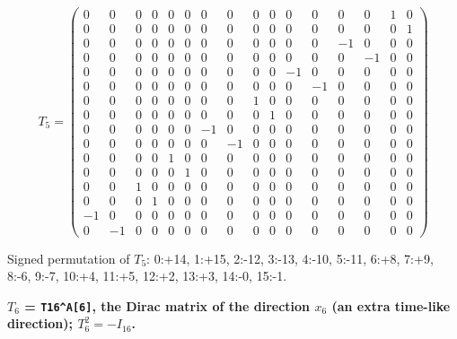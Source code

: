 \documentclass[
  10pt,
]{article}
\begin{document}
\[
T_5 = \scriptstyle \begin{pmatrix} 0 & 0 & 0 & 0 & 0 & 0 & 0 & 0 & 0 & 0 & 0 & 0 & 0 & 0 & 1 & 0 \\ 0 & 0 & 0 & 0 & 0 & 0 & 0 & 0 & 0 & 0 & 0 & 0 & 0 & 0 & 0 & 1 \\ 0 & 0 & 0 & 0 & 0 & 0 & 0 & 0 & 0 & 0 & 0 & 0 & -1 & 0 & 0 & 0 \\ 0 & 0 & 0 & 0 & 0 & 0 & 0 & 0 & 0 & 0 & 0 & 0 & 0 & -1 & 0 & 0 \\ 0 & 0 & 0 & 0 & 0 & 0 & 0 & 0 & 0 & 0 & -1 & 0 & 0 & 0 & 0 & 0 \\ 0 & 0 & 0 & 0 & 0 & 0 & 0 & 0 & 0 & 0 & 0 & -1 & 0 & 0 & 0 & 0 \\ 0 & 0 & 0 & 0 & 0 & 0 & 0 & 0 & 1 & 0 & 0 & 0 & 0 & 0 & 0 & 0 \\ 0 & 0 & 0 & 0 & 0 & 0 & 0 & 0 & 0 & 1 & 0 & 0 & 0 & 0 & 0 & 0 \\ 0 & 0 & 0 & 0 & 0 & 0 & -1 & 0 & 0 & 0 & 0 & 0 & 0 & 0 & 0 & 0 \\ 0 & 0 & 0 & 0 & 0 & 0 & 0 & -1 & 0 & 0 & 0 & 0 & 0 & 0 & 0 & 0 \\ 0 & 0 & 0 & 0 & 1 & 0 & 0 & 0 & 0 & 0 & 0 & 0 & 0 & 0 & 0 & 0 \\ 0 & 0 & 0 & 0 & 0 & 1 & 0 & 0 & 0 & 0 & 0 & 0 & 0 & 0 & 0 & 0 \\ 0 & 0 & 1 & 0 & 0 & 0 & 0 & 0 & 0 & 0 & 0 & 0 & 0 & 0 & 0 & 0 \\ 0 & 0 & 0 & 1 & 0 & 0 & 0 & 0 & 0 & 0 & 0 & 0 & 0 & 0 & 0 & 0 \\ -1 & 0 & 0 & 0 & 0 & 0 & 0 & 0 & 0 & 0 & 0 & 0 & 0 & 0 & 0 & 0 \\ 0 & -1 & 0 & 0 & 0 & 0 & 0 & 0 & 0 & 0 & 0 & 0 & 0 & 0 & 0 & 0 \end{pmatrix}
\]

Signed permutation of \(T_5\): 0:+14, 1:+15, 2:-12, 3:-13, 4:-10, 5:-11,
6:+8, 7:+9, 8:-6, 9:-7, 10:+4, 11:+5, 12:+2, 13:+3, 14:-0, 15:-1.

\textbf{\(T_6\) = \texttt{T16\^{}A{[}6{]}}, the Dirac matrix of the
direction \(x_6\) (an extra time-like direction); \(T_6^2 = -I_{16}\).}
\end{document}
